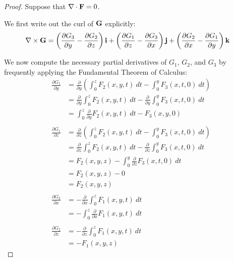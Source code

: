 \begin{proof}
    Suppose that \(\nabla \cdot \vb{F} = 0\).
    
    We first write out the curl of \(\vb{G}\) explicitly:
    \begin{align}
        \nabla \times \vb{G} &= \left(\frac{\partial G_3}{\partial y} - \frac{\partial G_2}{\partial z}\right) \vb{i} + \left(\frac{\partial G_1}{\partial z} - \frac{\partial G_3}{\partial x}\right) \vb{j} + \left(\frac{\partial G_2}{\partial x} - \frac{\partial G_1}{\partial y}\right) \vb{k} 
    \end{align}
    
    We now compute the necessary partial derivatives of \(G_1\), \(G_2\), and \(G_3\) by frequently applying the Fundamental Theorem of Calculus:
    \begin{align*}
        \frac{\partial G_1}{\partial y} &= \frac{\partial}{\partial y} \left(\int_0^z F_2(x, y, t) \ dt - \int_0^y F_3(x, t, 0) \ dt\right) \\
        &= \frac{\partial}{\partial y} \int_0^z F_2(x, y, t) \ dt - \frac{\partial}{\partial y} \int_0^y F_3(x, t, 0) \ dt \\
        &= \int_0^z \frac{\partial}{\partial y} F_2(x, y, t) \ dt - F_3(x, y, 0) \\
        \\
        \frac{\partial G_1}{\partial z} &= \frac{\partial}{\partial z} \left(\int_0^z F_2(x, y, t) \ dt - \int_0^y F_3(x, t, 0) \ dt\right) \\
        &= \frac{\partial}{\partial z} \int_0^z F_2(x, y, t) \ dt - \frac{\partial}{\partial z} \int_0^y F_3(x, t, 0) \ dt \\
        &= F_2(x, y, z) - \int_0^y \frac{\partial}{\partial z} F_3(x, t, 0) \ dt \\
        &= F_2(x, y, z) - 0 \\
        &= F_2(x, y, z) \\
        \\
        \frac{\partial G_2}{\partial x} &= -\frac{\partial}{\partial x} \int_0^z F_1(x, y, t) \ dt \\
        &= - \int_0^z \frac{\partial}{\partial x} F_1(x, y, t) \ dt \\
        \\
        \frac{\partial G_2}{\partial z} &= -\frac{\partial}{\partial z} \int_0^z F_1(x, y, t) \ dt \\
        &= - F_1(x, y, z)
    \end{align*}
    

\end{proof}
